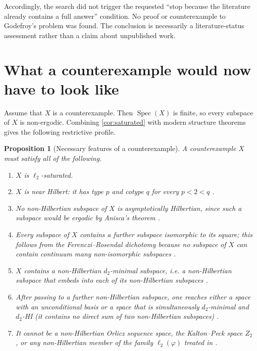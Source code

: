 \documentclass[11pt]{article}
\newtheorem{proposition}[theorem]{Proposition}
\theoremstyle{definition}
\theoremstyle{remark}
\newcommand{\ellTwo}{\ell_2}
\newcommand{\Spec}{\operatorname{Spec}}
\begin{document}
Accordingly, the search did not trigger the requested ``stop because the literature already contains a full answer'' condition.  No proof or counterexample to Godefroy's problem was found.  The conclusion is necessarily a literature-status assessment rather than a claim about unpublished work.

\section{What a counterexample would now have to look like}

Assume that \(X\) is a counterexample.  Then \(\Spec(X)\) is finite, so every subspace of \(X\) is non-ergodic.  Combining \cref{cor:saturated} with modern structure theorems gives the following restrictive profile.

\begin{proposition}[Necessary features of a counterexample]\label{prop:profile}
A counterexample \(X\) must satisfy all of the following.
\begin{enumerate}
  \item \(X\) is \(\ellTwo\)-saturated.
  \item \(X\) is near Hilbert: it has type \(p\) and cotype \(q\) for every \(p<2<q\) \cite{Cuellar2018}.
  \item No non-Hilbertian subspace of \(X\) is asymptotically Hilbertian, since such a subspace would be ergodic by Anisca's theorem \cite{Anisca2010}.
  \item Every subspace of \(X\) contains a further subspace isomorphic to its square; this follows from the Ferenczi--Rosendal dichotomy because no subspace of \(X\) can contain continuum many non-isomorphic subspaces \cite[Corollary 14]{FRnumber}.
  \item \(X\) contains a non-Hilbertian \(d_2\)-minimal subspace, i.e. a non-Hilbertian subspace that embeds into each of its non-Hilbertian subspaces \cite[Theorem 6.5]{CCRF2023}.
  \item After passing to a further non-Hilbertian subspace, one reaches either a space with an unconditional basis or a space that is simultaneously \(d_2\)-minimal and \(d_2\)-HI (it contains no direct sum of two non-Hilbertian subspaces) \cite[Theorem 6.23]{CCRF2023}.
  \item It cannot be a non-Hilbertian Orlicz sequence space, the Kalton--Peck space \(Z_2\), or any non-Hilbertian member of the family \(\ell_2(\varphi)\) treated in \cite{dRK2026}.
\end{enumerate}
\end{proposition}
\end{document}
